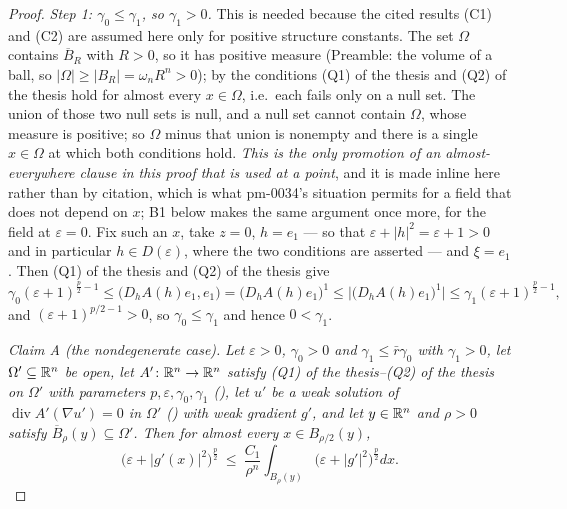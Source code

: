 \begin{proof}
\emph{Step 1: $\gamma_0\le\gamma_1$, so $\gamma_1>0$.}  This is needed because
the cited results (C1) and (C2) are assumed here only for positive structure
constants.  The set $\Omega$ contains $\overline B_R$ with $R>0$, so it has
positive measure (Preamble: the volume of a ball, so
$|\Omega|\ge|B_R|=\omega_nR^n>0$); by  the
conditions (Q1) of the thesis and (Q2) of the thesis hold for almost every $x\in\Omega$,
i.e.\ each fails only on a null set.  The union of those two null sets is null,
and a null set cannot contain $\Omega$, whose measure is positive; so
$\Omega$ minus that union is nonempty and there is a single $x\in\Omega$ at
which both conditions hold.  \emph{This is the only promotion of an
almost-everywhere clause in this proof that is used at a point}, and it is made
inline here rather than by citation, which is what pm-0034's situation permits
for a field that does not depend on $x$; B1 below makes the same argument once
more, for the field at $\varepsilon=0$.  Fix such an $x$, take $z=0$,
$h=e_1$ --- so that $\varepsilon+|h|^2=\varepsilon+1>0$ and in particular
$h\in D(\varepsilon)$, where the two conditions are asserted --- and $\xi=e_1$.
Then (Q1) of the thesis and (Q2) of the thesis give
\[
\gamma_0(\varepsilon+1)^{\frac p2-1}
\le\bigl(D_hA(h)e_1,e_1\bigr)=\bigl(D_hA(h)e_1\bigr)^1
\le\bigl|\bigl(D_hA(h)e_1\bigr)^1\bigr|
\le\gamma_1(\varepsilon+1)^{\frac p2-1},
\]
and $(\varepsilon+1)^{p/2-1}>0$, so $\gamma_0\le\gamma_1$ and hence
$0<\gamma_1$.

\emph{Claim A (the nondegenerate case).}  \emph{Let $\varepsilon>0$,
$\gamma_0>0$ and $\gamma_1\le\bar r\gamma_0$ with $\gamma_1>0$, let
$\Omega'\subseteq\mathbb{R}^n$ be open, let $A'\colon\mathbb{R}^n\to\mathbb{R}^n$ satisfy
(Q1) of the thesis--(Q2) of the thesis on $\Omega'$ with parameters
$p,\varepsilon,\gamma_0,\gamma_1$ (), let $u'$ be a
weak solution of $\operatorname{div}A'(\nabla u')=0$ in $\Omega'$
() with weak gradient $g'$, and let $y\in\mathbb{R}^n$ and
$\rho>0$ satisfy $\overline B_\rho(y)\subseteq\Omega'$.  Then for almost every
$x\in B_{\rho/2}(y)$,}
\[
\bigl(\varepsilon+|g'(x)|^2\bigr)^{\frac p2}
\ \le\ \frac{C_1}{\rho^n}\int_{B_\rho(y)}\bigl(\varepsilon+|g'|^2\bigr)^{\frac p2}dx .
\tag{A}
\]


\end{proof}
